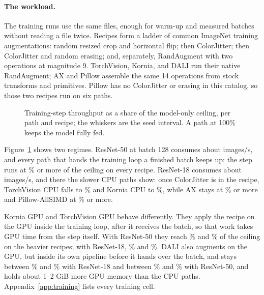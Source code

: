\documentclass[11pt]{article}
\begin{document}
\paragraph{The workload.} The training runs use the same \DatasetFiles{} files, enough for \TrainWarmupBatches{} warm-up
and \TrainMeasuredBatches{} measured batches without reading a file twice. Recipes form a ladder of
common ImageNet training augmentations: random resized crop and horizontal flip; then
ColorJitter; then ColorJitter and random erasing; and, separately, RandAugment
\cite{randaugment} with two operations at magnitude 9. TorchVision, Kornia, and DALI run their
native RandAugment; AX and Pillow assemble the same 14 operations from stock transforms and
primitives. Pillow has no ColorJitter or erasing in this catalog, so those two recipes run on six
paths.

\begin{figure}[H]
\centering

\caption{Training-step throughput as a share of the model-only ceiling, per path and recipe; the
whiskers are the seed interval. A path at 100\% keeps the model fully fed.}
\label{fig:training}
\end{figure}

Figure~\ref{fig:training} shows two regimes. ResNet-50 at batch 128 consumes about
\TrainCeilingResNetFifty{} images/s, and every path that hands the training loop a finished batch
keeps up: the step runs at \TrainReadyFloorResNetFifty\% or more of the ceiling on every recipe. ResNet-18 consumes about \TrainCeilingResNetEighteen{} images/s,
and there the slower CPU paths show: once ColorJitter is in the recipe, TorchVision CPU falls to
\TrainMinResNetEighteenTorchVisionCPU\% and Kornia CPU to \TrainMinResNetEighteenKorniaCPU\%, while AX stays at
\TrainMinResNetEighteenAlbumentationsX\% or more and Pillow-AllSIMD at
\TrainMinResNetEighteenAllSIMD\% or more.

Kornia GPU and TorchVision GPU behave differently. They apply the recipe on the GPU inside the
training loop, after it receives the batch, so that work takes GPU time from the step itself. With ResNet-50 they reach \TrainMinResNetFiftyKorniaGPU\% and
\TrainMinResNetFiftyTorchVisionGPU\% of the ceiling on the heavier recipes; with ResNet-18,
\TrainMinResNetEighteenKorniaGPU\% and \TrainMinResNetEighteenTorchVisionGPU\%. DALI also augments on
the GPU, but inside its own pipeline before it hands over the batch, and stays between
\TrainMinResNetEighteenDALIGPU\% and \TrainMaxResNetEighteenDALIGPU\% with ResNet-18 and
between \TrainMinResNetFiftyDALIGPU\% and \TrainMaxResNetFiftyDALIGPU\% with ResNet-50, and holds about 1--2 GiB
more GPU memory than the CPU paths. Appendix~\ref{app:training} lists every training cell.
\end{document}
